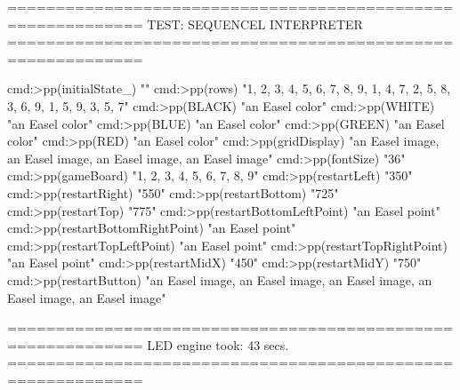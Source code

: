 \documentclass{led_doc}
\begin{document}
\begin{ledDef}
\end{ledDef}

\begin{ledDef}
\end{ledDef}

\begin{ledCmnt}
============================================================
TEST: SEQUENCEL INTERPRETER
============================================================

cmd:>pp(initialState_)
"{}"
cmd:>pp(rows)
"{{1, 2, 3}, {4, 5, 6}, {7, 8, 9}, {1, 4, 7}, {2, 5, 8}, {3, 6, 9}, {1, 5, 9}, {3, 5, 7}}"
cmd:>pp(BLACK)
"an Easel color"
cmd:>pp(WHITE)
"an Easel color"
cmd:>pp(BLUE)
"an Easel color"
cmd:>pp(GREEN)
"an Easel color"
cmd:>pp(RED)
"an Easel color"
cmd:>pp(gridDisplay)
"{an Easel image, an Easel image, an Easel image, an Easel image}"
cmd:>pp(fontSize)
"36"
cmd:>pp(gameBoard)
"{1, 2, 3, 4, 5, 6, 7, 8, 9}"
cmd:>pp(restartLeft)
"350"
cmd:>pp(restartRight)
"550"
cmd:>pp(restartBottom)
"725"
cmd:>pp(restartTop)
"775"
cmd:>pp(restartBottomLeftPoint)
"an Easel point"
cmd:>pp(restartBottomRightPoint)
"an Easel point"
cmd:>pp(restartTopLeftPoint)
"an Easel point"
cmd:>pp(restartTopRightPoint)
"an Easel point"
cmd:>pp(restartMidX)
"450"
cmd:>pp(restartMidY)
"750"
cmd:>pp(restartButton)
"{an Easel image, an Easel image, an Easel image, an Easel image, an Easel image}"

============================================================
LED engine took: 43 secs.
============================================================
\end{ledCmnt}
\end{document}
